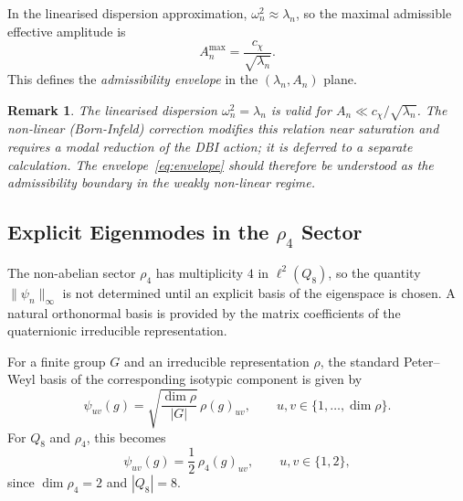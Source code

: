 \documentclass[11pt,a4paper]{article}
\newtheorem{remark}{Remark}
\begin{document}
    In the linearised dispersion approximation, $\omega_n^2 \approx \lambda_n$, so the
    maximal admissible effective amplitude is
    \begin{equation}
      \label{eq:envelope}
      A_n^{\max} = \frac{c_\chi}{\sqrt{\lambda_n}}.
    \end{equation}
    This defines the \emph{admissibility envelope} in the $(\lambda_n, A_n)$ plane.

    \begin{remark}
      The linearised dispersion $\omega_n^2 = \lambda_n$ is valid for
      $A_n \ll c_\chi / \sqrt{\lambda_n}$.
      The non-linear (Born-Infeld) correction modifies this relation near saturation and
      requires a modal reduction of the DBI action; it is deferred to a separate calculation.
      The envelope~\eqref{eq:envelope} should therefore be understood as the admissibility
      boundary in the weakly non-linear regime.
    \end{remark}

  \subsection{Explicit Eigenmodes in the $\rho_4$ Sector}
    \label{subsec:explicit-rho4}

    The non-abelian sector $\rho_4$ has multiplicity $4$ in $\ell^2(Q_8)$, so the
    quantity $\|\psi_n\|_\infty$ is not determined until an explicit basis of the
    eigenspace is chosen.
    A natural orthonormal basis is provided by the matrix coefficients of the
    quaternionic irreducible representation.

    For a finite group $G$ and an irreducible representation $\rho$, the standard
    Peter--Weyl basis of the corresponding isotypic component is given by
    \begin{equation}
      \psi_{uv}(g)
      =
      \sqrt{\frac{\dim \rho}{|G|}}\,\rho(g)_{uv},
      \qquad
      u,v \in \{1,\dots,\dim \rho\}.
    \end{equation}
    For $Q_8$ and $\rho_4$, this becomes
    \begin{equation}
      \psi_{uv}(g)
      =
      \frac{1}{2}\,\rho_4(g)_{uv},
      \qquad
      u,v \in \{1,2\},
    \end{equation}
    since $\dim \rho_4 = 2$ and $|Q_8| = 8$.
\end{document}
